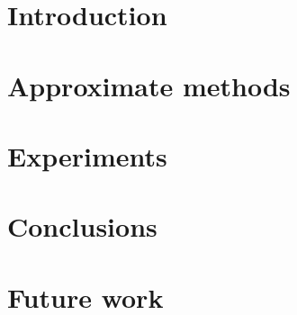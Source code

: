 \documentclass[12pt]{article}
\begin{document}
	
\renewcommand{\contentsname}{\centerline{\bf Contents}}
\renewcommand{\figurename}{Fig.}
\renewcommand{\refname}{\centerline{\bf Literature}}

\newcommand{\GP}{\mathcal{GP}}
\newcommand{\E}{\mathbb{E}}
\newcommand{\R}{\mathbb{R}}
\newcommand{\N}{\mathcal{N}}
\newcommand{\bigO}{\mathcal{O}}
\newcommand{\cov}{\mbox{cov}}
\newcommand{\Nystrom}{Nystr\"{o}m }
\newcommand{\KL}[2]{\mbox{KL}\left(#1\mbox{ || }#2\right)}
\newcommand{\tr}{\mbox{tr}}
\newcommand{\derivative}[2]{\frac{\partial #1}{\partial #2}}
\newcommand{\sndderivative}[3]{\frac{\partial^2 #1}{\partial #2 \partial #3}}

\newlength{\arrayrulewidthOriginal}
\newcommand{\Cline}[2]{%
  \noalign{\global\setlength{\arrayrulewidthOriginal}{\arrayrulewidth}}%
  \noalign{\global\setlength{\arrayrulewidth}{#1}}\cline{#2}%
  \noalign{\global\setlength{\arrayrulewidth}{\arrayrulewidthOriginal}}}

\newtheorem{definition}{Definition}
\newtheorem{theorem}{Theorem}


\pagebreak
{\hypersetup{linkcolor=black}
	\tableofcontents
}
\pagebreak

\section{Introduction}	
	
\pagebreak
\section{Approximate methods}
	
\pagebreak
\section{Experiments}
	
\pagebreak
\section{Conclusions}
	
\section{Future work}
	
\pagebreak

\end{document}
